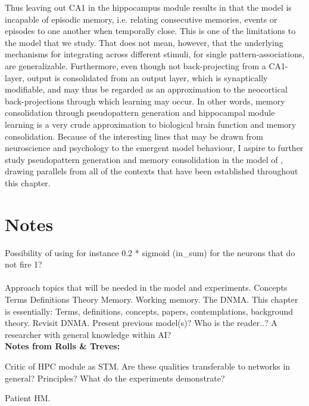 Thus leaving out CA1 in the hippocampus module results in that the model is incapable of episodic memory, i.e. relating consecutive memories, events or episodes to one another when temporally close. This is one of the limitations to the model that we study. That does not mean, however, that the underlying mechanisms for integrating across different stimuli, for single pattern-associations, are generalizable. Furthermore, even though not back-projecting from a CA1-layer, output is consolidated from an output layer, which is synaptically modifiable, and may thus be regarded as an approximation to the neocortical back-projections through which learning may occur. In other words, memory consolidation through pseudopattern generation and hippocampal module learning is a very crude approximation to biological brain function and memory consolidation. Because of the interesting lines that may be drawn from neuroscience and psychology to the emergent model behaviour, I aspire to further study pseudopattern generation and memory consolidation in the model of \cite{Hattori2014}, drawing parallels from all of the contexts that have been established throughout this chapter.

\section{Notes}

Possibility of using for instance 0.2 * sigmoid (in\_sum) for the neurons that do not fire 1?
\\\\

Approach topics that will be needed in the model and experiments.
Concepts
Terms
Definitions
Theory
Memory. Working memory.
The DNMA.
This chapter is essentially: Terms, definitions, concepts, papers, contemplations, background theory. Revisit DNMA.
Present previous model(s)?
Who is the reader..? A researcher with general knowledge within AI?
\\

\textbf{Notes from Rolls \& Treves:}

Critic of HPC module as STM. Are these qualities transferable to networks in general? Principles? What do the experiments demonstrate?

Patient HM.

\cleardoublepage